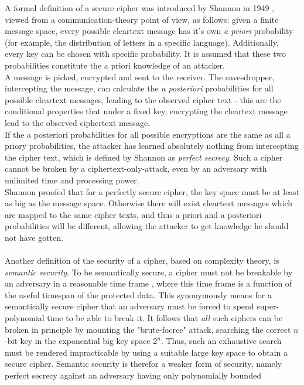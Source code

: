 A formal definition of a secure cipher was introduced by Shannon in 1949 \cite{6769090}, viewed from a communication-theory point of view, as follows:
given a finite message space, every possible cleartext message has it's own \textit{a priori} probability (for example, the distribution of letters in a 
specific language). Additionally, every key can be chosen with specific probability. It is assumed that these
two probabilities constitute the a priori knowledge of an attacker.
\\
A message is picked, encrypted
and sent to the receiver. The eavesdropper, intercepting the message, can calculate the \textit{a posteriori} probabilities for all possible cleartext messages, 
leading to the observed cipher text - this are the conditional properties that under a fixed key, encrypting the cleartext message lead to the
observed ciphertext message.
\\
If the a posteriori probabilities for all possible encryptions are the same as all a priory probabilities, the attacker has learned absolutely
nothing from intercepting the cipher text, which is defined by Shannon as \textit{perfect secrecy}. Such a cipher cannot be broken by a ciphertext-only-attack,
even by an adversary with unlimited time and processing power.
\\
Shannon proofed that for a perfectly secure cipher, the key space must be at least as big as the message space.
Otherwise there will exist cleartext messages which are mapped to the same cipher texts, and thus a priori and a posteriori probabilities will be different,
allowing the attacker to get knowledge he should not have gotten. 
\\
\\
Another definition of the security of a cipher, based on complexity theory, is \textit{semantic security}.
To be semantically secure, a cipher must not be breakable by an adversary in a reasonable time
frame \cite{handbook1}, where this time frame is a function of the useful timespan of the protected data. This synonymously means for a semantically secure
cipher that an adversary must be forced to spend super-polynomial time to be able to break it. It follows that \textit{all} such ciphers
can be broken in principle by mounting the "brute-focrce" attack, searching the correct $n$-bit key in the exponential big key space $2^n$. Thus, such an
exhaustive search must be rendered impracticable by using a suitable large key space to obtain a secure cipher.
Semantic security is therefor a weaker form of security, namely perfect secrecy against an adversary having only polynomially bounded
